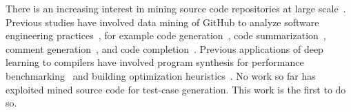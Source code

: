 There is an increasing interest in mining source code repositories at large scale~\cite{Allamanis2013a,White2015a,Bird2009}. Previous studies have involved data mining of GitHub to analyze software engineering practices~\cite{Wu2014,Guzman2014,Baishakhi2014a,Vasilescu2015}, for example code generation~\cite{Zhang2015a}, code summarization~\cite{Allamanis2016}, comment generation~\cite{Wong2013}, and code completion~\cite{Raychev2014}. Previous applications of deep learning to compilers have involved program synthesis for performance benchmarking~\cite{Cummins2017a} and building optimization heuristics~\cite{Cummins2017b}. No work so far has exploited mined source code for test-case generation. This work is the first to do so.
